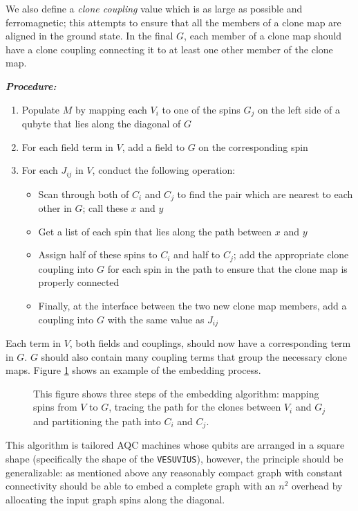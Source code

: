 We also define a \emph{clone coupling} value which is as large as possible and ferromagnetic; this attempts to ensure that all the members of a clone map are aligned in the ground state.  In the final $G$, each member of a clone map should have a clone coupling connecting it to at least one other member of the clone map.

\emph{\textbf{Procedure:}}
\begin{enumerate}
	\item Populate $M$ by mapping each $V_i$ to one of the spins $G_j$ on the left side of a qubyte that lies along the diagonal of $G$
	\item For each field term in $V$, add a field to $G$ on the corresponding spin
	\item For each $J_{ij}$ in $V$, conduct the following operation:
		\begin{itemize}
			\item Scan through both of $C_i$ and $C_j$ to find the pair which are nearest to each other in $G$; call these $x$ and $y$
			\item Get a list of each spin that lies along the path between $x$ and $y$
			\item Assign half of these spins to $C_i$ and half to $C_j$; add the appropriate clone coupling into $G$ for each spin in the path to ensure that the clone map is properly connected
			\item Finally, at the interface between the two new clone map members, add a coupling into $G$ with the same value as $J_{ij}$
		\end{itemize}
\end{enumerate}

Each term in $V$, both fields and couplings, should now have a corresponding term in $G$.  $G$ should also contain many coupling terms that group the necessary clone maps.  Figure \ref{fig:embedding} shows an example of the embedding process.


\begin{figure}
	\caption[Embedding Algorithm]{This figure shows three steps of the embedding algorithm: mapping spins from $V$ to $G$, tracing the path for the clones between $V_i$ and $G_j$ and partitioning the path into $C_i$ and $C_j$.}
	\label{fig:embedding}
\end{figure}

This algorithm is tailored AQC machines whose qubits are arranged in a square shape (specifically the shape of the \texttt{VESUVIUS}), however, the principle should be generalizable: as mentioned above any reasonably compact graph with constant connectivity should be able to embed a complete graph with an $n^2$ overhead by allocating the input graph spins along the diagonal.
